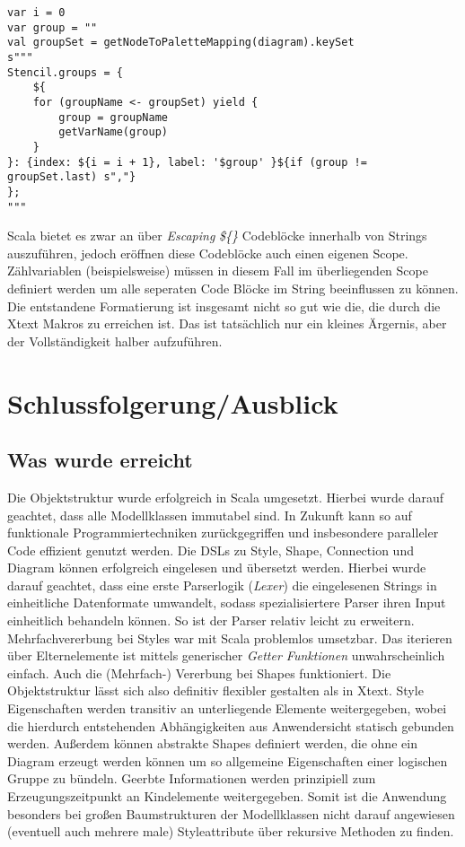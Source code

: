 \begin{lstlisting}[style = scala, caption = {String der in Scala über Interpolation modifiziert wird}, label = {lst:scalastring}]
var i = 0
var group = ""
val groupSet = getNodeToPaletteMapping(diagram).keySet
s"""
Stencil.groups = {
	${
	for (groupName <- groupSet) yield {
		group = groupName
		getVarName(group)
	}
}: {index: ${i = i + 1}, label: '$group' }${if (group != groupSet.last) s","}
};
"""
\end{lstlisting}Scala bietet es zwar an über \textit{Escaping} \textit{\$\{\}} Codeblöcke innerhalb von Strings auszuführen, jedoch eröffnen diese Codeblöcke auch einen eigenen Scope. Zählvariablen (beispielsweise) müssen in diesem Fall im überliegenden Scope definiert werden um alle seperaten Code Blöcke im String beeinflussen zu können. Die entstandene Formatierung ist insgesamt nicht so gut wie die, die durch die Xtext Makros zu erreichen ist. Das ist tatsächlich nur ein kleines Ärgernis, aber der Vollständigkeit halber aufzuführen.

\section{Schlussfolgerung/Ausblick}
\subsection{Was wurde erreicht}
Die Objektstruktur wurde erfolgreich in Scala umgesetzt. Hierbei wurde darauf geachtet, dass alle Modellklassen immutabel sind. In Zukunft kann so auf funktionale Programmiertechniken zurückgegriffen und insbesondere paralleler Code effizient genutzt werden. Die DSLs zu Style, Shape, Connection und Diagram können erfolgreich eingelesen und übersetzt werden. Hierbei wurde darauf geachtet, dass eine erste Parserlogik (\textit{Lexer}) die eingelesenen Strings in einheitliche Datenformate umwandelt, sodass spezialisiertere Parser ihren Input einheitlich behandeln können. So ist der Parser relativ leicht zu erweitern. Mehrfachvererbung bei Styles war mit Scala problemlos umsetzbar. Das iterieren über Elternelemente ist mittels generischer \textit{Getter Funktionen} unwahrscheinlich einfach. Auch die (Mehrfach-) Vererbung bei Shapes funktioniert. Die Objektstruktur lässt sich also definitiv flexibler gestalten als in Xtext. Style Eigenschaften werden transitiv an unterliegende Elemente weitergegeben, wobei die hierdurch entstehenden Abhängigkeiten aus Anwendersicht statisch gebunden werden. Außerdem können abstrakte Shapes definiert werden, die ohne ein Diagram erzeugt werden können um so allgemeine Eigenschaften einer logischen Gruppe zu bündeln. Geerbte Informationen werden prinzipiell zum Erzeugungszeitpunkt an Kindelemente weitergegeben. Somit ist die Anwendung besonders bei großen Baumstrukturen der Modellklassen nicht darauf angewiesen (eventuell auch mehrere male) Styleattribute über rekursive Methoden zu finden. 

